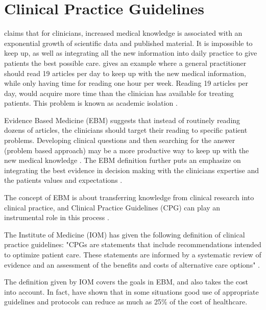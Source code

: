 
\section{Clinical Practice Guidelines}
\textcite{Fervers2010} claims that for clinicians, increased medical knowledge is associated with an exponential growth of scientific data and published material. It is impossible to keep up, as well as integrating all the new information into daily practice to give patients the best possible care.  \textcite{Masic2008} gives an example where a general practitioner should read 19 articles per day to keep up with the new medical information, while only having time for reading one hour per week. Reading 19 articles per day, would acquire more time than the clinician has available for treating patients. This problem is known as academic isolation \parencite{Masic2008}.

Evidence Based Medicine (EBM) suggests that instead of routinely reading dozens of articles, the clinicians should target their reading to specific patient problems. Developing clinical questions and then searching for the answer (problem based approach) may be a more productive way to keep up with the new medical knowledge \parencite{Masic2008}. The EBM definition further puts an emphasize on integrating the best evidence in decision making with the clinicians expertise and the patients values and expectations \parencite{Masic2008}. 

The concept of EBM is about transferring knowledge from clinical research into clinical practice, and Clinical Practice Guidelines (CPG) can play an instrumental role in this process \parencite{Fervers2010}.

The Institute of Medicine (IOM) has given the following definition of clinical practice guidelines: "CPGs are statements that include recommendations intended to optimize patient care. These statements are informed by a systematic review of evidence and an assessment of the benefits and costs of alternative care options" \parencite{Guidelines2011}.

The definition given by IOM covers the goals in EBM, and also takes the cost into account. In fact, \textcite{Clayton1995} have shown that in some situations good use of appropriate guidelines and protocols can reduce as much as 25\% of the cost of healthcare.


